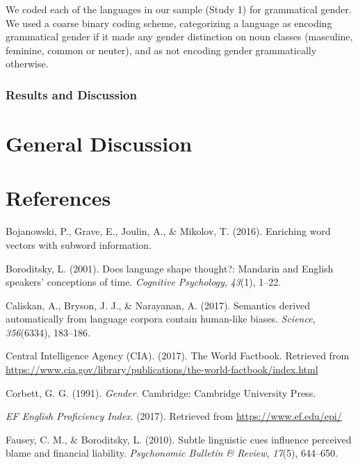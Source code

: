 \documentclass[man,floatsintext]{apa6}
\theoremstyle{definition}
\theoremstyle{definition}
\theoremstyle{definition}
\theoremstyle{remark}
\begin{document}
We coded each of the languages in our sample (Study 1) for grammatical
gender. We used a coarse binary coding scheme, categorizing a language
as encoding grammatical gender if it made any gender distinction on noun
classes (masculine, feminine, common or neuter), and as not encoding
gender grammatically otherwise.

\subsubsection{Results and Discussion}\label{results-and-discussion-1}

\section{General Discussion}\label{general-discussion}

\newpage

\section{References}\label{references}

\begingroup
\setlength{\parindent}{-0.5in} \setlength{\leftskip}{0.5in}

\hypertarget{refs}{}
\hypertarget{ref-bojanowski2016enriching}{}
Bojanowski, P., Grave, E., Joulin, A., \& Mikolov, T. (2016). Enriching
word vectors with subword information.

\hypertarget{ref-boroditsky2001does}{}
Boroditsky, L. (2001). Does language shape thought?: Mandarin and
English speakers' conceptions of time. \emph{Cognitive Psychology},
\emph{43}(1), 1--22.

\hypertarget{ref-caliskan2017semantics}{}
Caliskan, A., Bryson, J. J., \& Narayanan, A. (2017). Semantics derived
automatically from language corpora contain human-like biases.
\emph{Science}, \emph{356}(6334), 183--186.

\hypertarget{ref-ciafactbook}{}
Central Intelligence Agency (CIA). (2017). The World Factbook. Retrieved
from
\url{https://www.cia.gov/library/publications/the-world-factbook/index.html}

\hypertarget{ref-corbett1991}{}
Corbett, G. G. (1991). \emph{Gender}. Cambridge: Cambridge University
Press.

\hypertarget{ref-epi}{}
\emph{EF English Proficiency Index}. (2017). Retrieved from
\url{https://www.ef.edu/epi/}

\hypertarget{ref-fausey2010subtle}{}
Fausey, C. M., \& Boroditsky, L. (2010). Subtle linguistic cues
influence perceived blame and financial liability. \emph{Psychonomic
Bulletin \& Review}, \emph{17}(5), 644--650.
\end{document}
